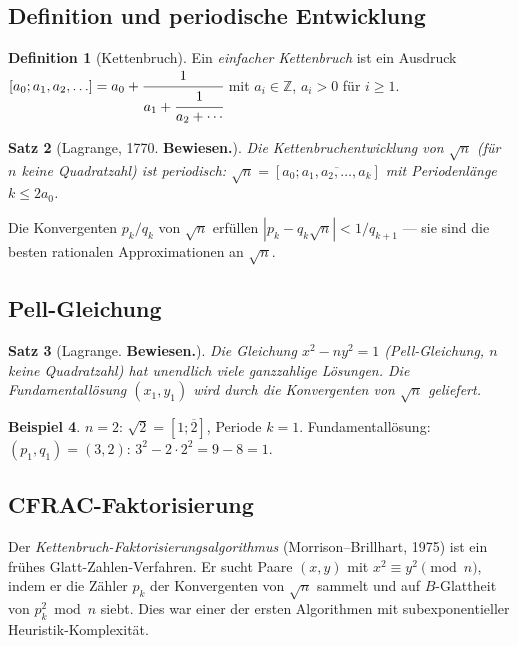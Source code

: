 \documentclass[12pt,a4paper]{amsart}
\newtheorem{theorem}{Satz}[section]
\theoremstyle{definition}
\newtheorem{definition}[theorem]{Definition}
\newtheorem{beispiel}[theorem]{Beispiel}
\begin{document}
\subsection{Definition und periodische Entwicklung}

\begin{definition}[Kettenbruch]
Ein \emph{einfacher Kettenbruch} ist ein Ausdruck
$[a_0; a_1, a_2, \ldots] = a_0 + \cfrac{1}{a_1 + \cfrac{1}{a_2 + \cdots}}$
mit $a_i \in \mathbb{Z}$, $a_i > 0$ für $i \ge 1$.
\end{definition}

\begin{theorem}[Lagrange, 1770. \textbf{Bewiesen.}]
Die Kettenbruchentwicklung von $\sqrt{n}$ (für $n$ keine Quadratzahl) ist
periodisch: $\sqrt{n} = [a_0; \overline{a_1, a_2, \ldots, a_k}]$ mit Periodenlänge
$k \le 2a_0$.
\end{theorem}

Die Konvergenten $p_k/q_k$ von $\sqrt{n}$ erfüllen
$|p_k - q_k\sqrt{n}| < 1/q_{k+1}$ — sie sind die besten rationalen
Approximationen an $\sqrt{n}$.

\subsection{Pell-Gleichung}

\begin{theorem}[Lagrange. \textbf{Bewiesen.}]
Die Gleichung $x^2 - ny^2 = 1$ (Pell-Gleichung, $n$ keine Quadratzahl) hat
unendlich viele ganzzahlige Lösungen. Die Fundamentallösung $(x_1, y_1)$
wird durch die Konvergenten von $\sqrt{n}$ geliefert.
\end{theorem}

\begin{beispiel}
$n=2$: $\sqrt{2} = [1;\overline{2}]$, Periode $k=1$. Fundamentallösung:
$(p_1, q_1) = (3, 2)$: $3^2 - 2\cdot 2^2 = 9-8 = 1$.
\end{beispiel}

\subsection{CFRAC-Faktorisierung}

Der \emph{Kettenbruch-Faktorisierungsalgorithmus} (Morrison--Brillhart, 1975)
ist ein frühes Glatt-Zahlen-Verfahren. Er sucht Paare $(x,y)$ mit
$x^2 \equiv y^2 \pmod{n}$, indem er die Zähler $p_k$ der Konvergenten
von $\sqrt{n}$ sammelt und auf $B$-Glattheit von $p_k^2 \bmod n$ siebt.
Dies war einer der ersten Algorithmen mit subexponentieller Heuristik-Komplexität.
\end{document}
